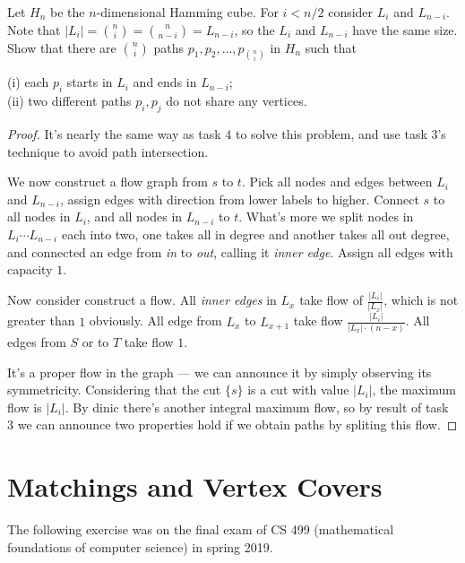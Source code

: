 \documentclass[11pt,a4paper,oneside]{article}
\begin{document}
\begin{problem}{5}
	\statement
  Let $H_n$ be the $n$-dimensional Hamming cube. For $i < n/2$ consider
  $L_i$ and $L_{n-i}$. Note that 
  $|L_i| = {n \choose i} = { n \choose n-i}  = L_{n-i}$, so the 
  $L_i$ and $L_{n-i}$ have the same size.   Show that there are ${n \choose i}$ paths $p_1,p_2,\dots,p_{ {n \choose i}}$
  in $H_n$ such that

  (i) each $p_i$ starts in $L_i$ and ends in $L_{n-i}$; \\
  (ii) two different paths $p_i,p_j$ do not share any vertices.
  
    \solution
    \begin{proof}
      It's nearly the same way as task $4$ to solve this problem, and use task $3$'s technique to avoid path intersection.  

      We now construct a flow graph from $s$ to $t$. Pick all nodes and edges between $L_i$ and $L_{n - i}$, assign edges with direction from lower labels to higher. Connect $s$ to all nodes in $L_i$, and all nodes in $L_{n - i}$ to $t$. What's more we split nodes in $L_i \cdots L_{n - i}$ each into two, one takes all in degree and another takes all out degree, and connected an edge from \textit{in} to \textit{out}, calling it \textit{inner edge}. Assign all edges with capacity $1$.

      Now consider construct a flow. All \textit{inner edges} in $L_x$ take flow of $\frac {|L_i|} {|L_x|}$, which is not greater than $1$ obviously. All edge from $L_{x}$ to $L_{x + 1}$ take flow $\frac {|L_i|} {|L_x| \cdot (n - x)}$. All edges from $S$ or to $T$ take flow $1$.
      
      It's a proper flow in the graph --- we can announce it by simply observing its symmetricity. Considering that the cut $\{s\}$ is a cut with value $|L_i|$, the maximum flow is $|L_i|$. By dinic there's another integral maximum flow, so by result of task $3$ we can announce two properties hold if we obtain paths by spliting this flow.
    \end{proof}
\end{problem}


\section*{Matchings and Vertex Covers}

The following exercise was on the final exam of CS 499 (mathematical foundations of computer science) in spring 2019.
\end{document}

